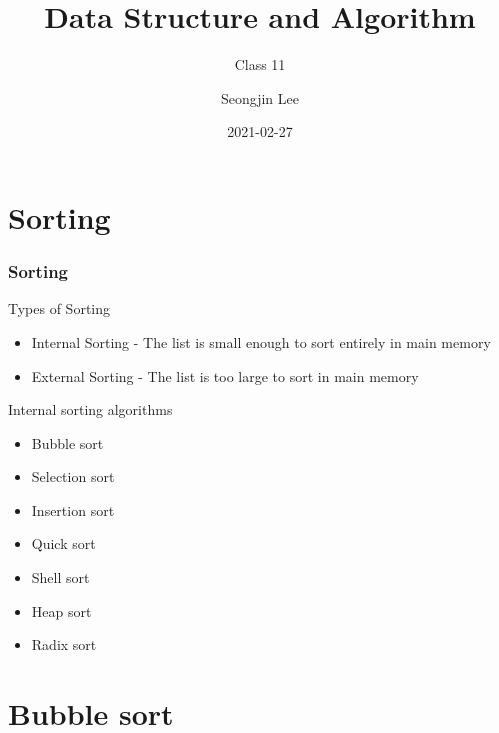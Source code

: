 \documentclass[newPxFont,sthlmFooter,nooffset]{beamer}
\title{Data Structure and Algorithm}
\subtitle{Class 11}
\author[SJL]{Seongjin Lee}
\institute{\href{mailto:insight@gnu.ac.kr}{insight@gnu.ac.kr}\\\url{http://resourceful.github.io}\\Systems Research Lab.\\GNU}
\date{2021-02-27}
\begin{document}
\lstset{basicstyle=\normalsize\ttfamily, language=C}

\frame[plain,t]{\titlepage} 




\section{Sorting}

\begin{frame}[t]
  \frametitle{Sorting}
Types of Sorting
\begin{itemize}
\item Internal Sorting - The list is small enough to sort entirely in main memory
\item External Sorting - The list is too large to sort in main memory
\end{itemize}

Internal sorting algorithms

\begin{itemize}
\item Bubble sort
\item Selection sort
\item Insertion sort
\item Quick sort
\item Shell sort
\item Heap sort
\item Radix sort
\end{itemize}
\end{frame}

\section{Bubble sort}
\end{document}
